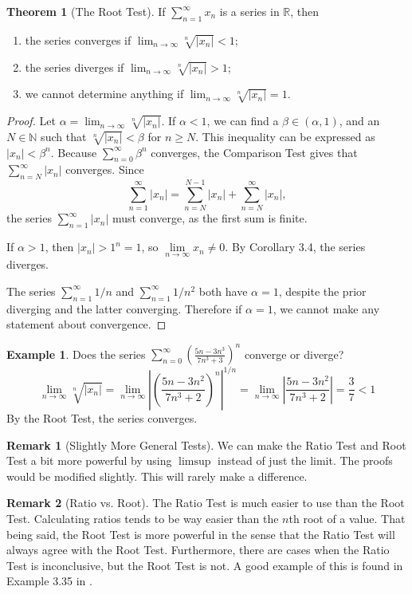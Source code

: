 \documentclass{article}
\newcommand{\N}{\mathbb{N}}
\newcommand{\R}{\mathbb{R}}
\theoremstyle{definition}
\newtheorem{theorem}{Theorem}[section]
\newtheorem{example}{Example}[section]
\newtheorem{remark}{Remark}[section]
\begin{document}
\begin{theorem}[The Root Test]
	If $ \sum_{n=1}^{\infty}x_n  $ is a series in $ \R $, then
	\begin{enumerate}
		\item the series converges if $ \lim_{n\to\infty}\sqrt[n]{|x_n|}<1 $;
		\item the series diverges if $ \lim_{n\to\infty}\sqrt[n]{|x_n|}>1 $;
		\item we cannot determine anything if $ \lim_{n\to\infty}\sqrt[n]{|x_n|}=1 $.
	\end{enumerate} 
\end{theorem}
\begin{proof}
Let $ \alpha=\lim_{n\to\infty}\sqrt[n]{|x_n|} $. If $ \alpha <1 $, we can find a $ \beta\in(\alpha,1) $, and an $ N\in\N $ such that $ \sqrt[n]{|x_n|}<\beta$ for $ n\ge N $. This inequality can be expressed as $ |x_n|<\beta^n $. Because $ \sum_{n=0}^{\infty}\beta^n $ converges, the Comparison Test gives that $\sum_{n=N}^\infty{|x_n|}$ converges. Since $$ \sum_{n=1}^\infty{|x_n|}=\sum_{n=N}^{N-1}{|x_n|}+\sum_{n=N}^\infty{|x_n|},$$ the series $ \sum_{n=1}^\infty{|x_n|} $ must converge, as the first sum is finite. 

If $ \alpha>1 $, then $ |x_n|>1^n=1 $, so $ \lim\limits_{n\to\infty}x_n\neq 0 $. By Corollary 3.4, the series diverges.

The series $ \sum_{n=1}^{\infty}1/n $ and $ \sum_{n=1}^{\infty}1/n^2 $ both have $ \alpha=1 $, despite the prior diverging and the latter converging. Therefore if $ \alpha=1 $, we cannot make any statement about convergence. 
\end{proof}
\begin{example}
	Does the series $\sum_{n=0}^{\infty}\left(\frac{5n-3n^3}{7n^3+3}\right)^n $ converge or diverge? 
	$$\lim\limits_{n\to\infty}\sqrt[n]{|x_n|}=\lim\limits_{n\to\infty}\left\lvert\left(\frac{5n-3n^2}{7n^3+2}\right)^n\right\rvert^{1/n} =\lim\limits_{n\to\infty}\left\lvert\frac{5n-3n^2}{7n^3+2}\right\rvert=\frac{3}{7}<1$$ By the Root Test, the series converges.
\end{example}
\begin{remark}[Slightly More General Tests]
 We can make the Ratio Test and Root Test a bit more powerful by using $ \limsup $ instead of just the limit. The proofs would be modified slightly. This will rarely make a difference. 
\end{remark}
\begin{remark}[Ratio vs. Root]
	The Ratio Test is much easier to use than the Root Test. Calculating ratios tends to be way easier than the $ n $th root of a value. That being said, the Root Test is more powerful in the sense that the Ratio Test will always agree with the Root Test. Furthermore, there are cases when the Ratio Test is inconclusive, but the Root Test is not. A good example of this is found in Example 3.35 in \cite{rudin1964principles}. 
\end{remark}
\end{document}
